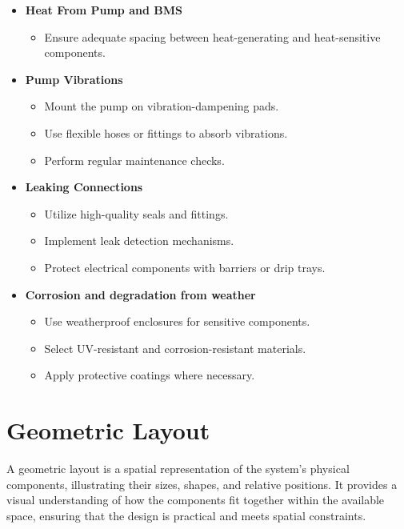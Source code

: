 \documentclass[12pt]{report}
\begin{document}
\begin{itemize}
    \item \textbf{Heat From Pump and BMS}
    \begin{itemize}
        \item Ensure adequate spacing between heat-generating and heat-sensitive components.
    \end{itemize}
    \item \textbf{Pump Vibrations}
    \begin{itemize}
        \item Mount the pump on vibration-dampening pads.
        \item Use flexible hoses or fittings to absorb vibrations.
        \item Perform regular maintenance checks.
    \end{itemize}
    \item \textbf{Leaking Connections}
    \begin{itemize}
        \item Utilize high-quality seals and fittings.
        \item Implement leak detection mechanisms.
        \item Protect electrical components with barriers or drip trays.
    \end{itemize}
    \item \textbf{Corrosion and degradation from weather}
    \begin{itemize}
        \item Use weatherproof enclosures for sensitive components.
        \item Select UV-resistant and corrosion-resistant materials.
        \item Apply protective coatings where necessary.
    \end{itemize}

\end{itemize}





\section{Geometric Layout}
\label{sec:geometric_layout}

A geometric layout is a spatial representation of the system's physical components, illustrating their sizes, shapes, and relative positions. It provides a visual understanding of how the components fit together within the available space, ensuring that the design is practical and meets spatial constraints.
\end{document}
